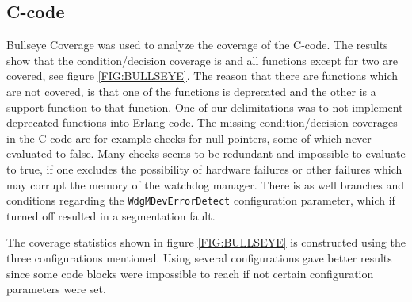 \subsection{C-code}
Bullseye Coverage was used to analyze the coverage of the C-code. The
results show that the condition/decision coverage is {\bullseyecoverage}
and all functions except for two are covered, see figure
\ref{FIG:BULLSEYE}. The reason that there are functions which are not
covered, is that one of the functions is deprecated and the other is a
support function to that function. One of our delimitations was to not
implement deprecated functions into Erlang code. The missing
condition/decision coverages in the C-code are for example checks for
null pointers, some of which never evaluated to false. Many checks
seems to be redundant and impossible to evaluate to true, if one
excludes the possibility of hardware failures or other failures which
may corrupt the memory of the watchdog manager. There is as well
branches and conditions regarding the \lstinline!WdgMDevErrorDetect!
configuration parameter, which if turned off resulted in a
segmentation fault.

The coverage statistics shown in figure \ref{FIG:BULLSEYE} is
constructed using the three configurations mentioned. Using several configurations
gave better results since some code blocks were impossible to reach if not
certain configuration parameters were set.

